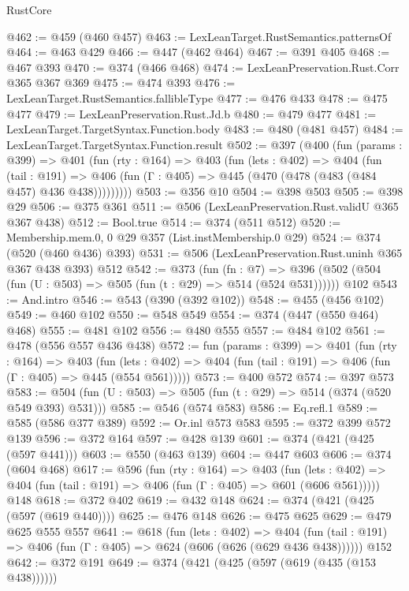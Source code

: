 \begin{lexlean}{RustCore}
\begin{coremodule}
@462 := @459 (@460 @457)
@463 := LexLeanTarget.RustSemantics.patternsOf
@464 := @463 @429
@466 := @447 (@462 @464)
@467 := @391 @405
@468 := @467 @393
@470 := @374 (@466 @468)
@474 := LexLeanPreservation.Rust.Corr @365 @367 @369
@475 := @474 @393
@476 := LexLeanTarget.RustSemantics.fallibleType
@477 := @476 @433
@478 := @475 @477
@479 := LexLeanPreservation.Rust.Jd.b
@480 := @479 @477
@481 := LexLeanTarget.TargetSyntax.Function.body
@483 := @480 (@481 @457)
@484 := LexLeanTarget.TargetSyntax.Function.result
@502 := @397
    (@400
      (fun (params : @399) =>
      @401
        (fun (rty : @164) =>
        @403
          (fun (lets : @402) =>
          @404
            (fun (tail : @191) =>
            @406 (fun (Γ : @405) => @445 (@470 (@478 (@483 (@484 @457) @436 @438)))))))))
@503 := @356 @10
@504 := @398 @503
@505 := @398 @29
@506 := @375 @361
@511 := @506 (LexLeanPreservation.Rust.validU @365 @367 @438)
@512 := Bool.true
@514 := @374 (@511 @512)
@520 := Membership.mem.{0, 0} @29 @357 (List.instMembership.{0} @29)
@524 := @374 (@520 (@460 @436) @393)
@531 := @506 (LexLeanPreservation.Rust.uninh @365 @367 @438 @393) @512
@542 := @373
    (fun (fn : @7) =>
    @396 (@502 (@504 (fun (U : @503) => @505 (fun (t : @29) => @514 (@524 @531))))))
    @102
@543 := And.intro
@546 := @543 (@390 (@392 @102))
@548 := @455 (@456 @102)
@549 := @460 @102
@550 := @548 @549
@554 := @374 (@447 (@550 @464) @468)
@555 := @481 @102
@556 := @480 @555
@557 := @484 @102
@561 := @478 (@556 @557 @436 @438)
@572 := fun (params : @399) =>
  @401
    (fun (rty : @164) =>
    @403
      (fun (lets : @402) => @404 (fun (tail : @191) => @406 (fun (Γ : @405) => @445 (@554 @561)))))
@573 := @400 @572
@574 := @397 @573
@583 := @504 (fun (U : @503) => @505 (fun (t : @29) => @514 (@374 (@520 @549 @393) @531)))
@585 := @546 (@574 @583)
@586 := Eq.refl.{1}
@589 := @585 (@586 @377 @389)
@592 := Or.inl @573 @583
@595 := @372 @399 @572 @139
@596 := @372 @164
@597 := @428 @139
@601 := @374 (@421 (@425 (@597 @441)))
@603 := @550 (@463 @139)
@604 := @447 @603
@606 := @374 (@604 @468)
@617 := @596
    (fun (rty : @164) =>
    @403
      (fun (lets : @402) => @404 (fun (tail : @191) => @406 (fun (Γ : @405) => @601 (@606 @561)))))
    @148
@618 := @372 @402
@619 := @432 @148
@624 := @374 (@421 (@425 (@597 (@619 @440))))
@625 := @476 @148
@626 := @475 @625
@629 := @479 @625 @555 @557
@641 := @618
    (fun (lets : @402) =>
    @404 (fun (tail : @191) => @406 (fun (Γ : @405) => @624 (@606 (@626 (@629 @436 @438))))))
    @152
@642 := @372 @191
@649 := @374 (@421 (@425 (@597 (@619 (@435 (@153 @438))))))

\end{coremodule}
\end{lexlean}
